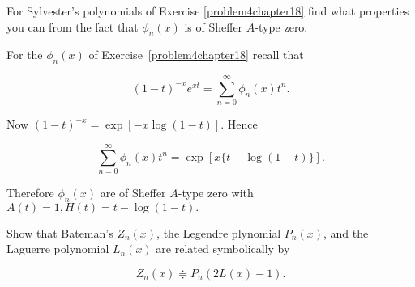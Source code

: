 \begin{problem}\label{problem5chapter18}
For Sylvester's polynomials of Exercise \ref{problem4chapter18} find what properties you can from the fact that $\phi_n(x)$ is of Sheffer $A$-type zero.
\end{problem}
\begin{solution}
For the $\phi_n(x)$ of Exercise~\ref{problem4chapter18} recall that

$$(1-t)^{-x} e^{xt} = \displaystyle\sum_{n=0}^{\infty} \phi_n(x) t^n.$$

Now $(1-t)^{-x} = \exp[-x \log(1-t)].$ Hence

$$\displaystyle\sum_{n=0}^{\infty} \phi_n(x) t^n = \exp[x \{t-\log(1-t)\}].$$

Therefore $\phi_n(x)$ are of Sheffer $A$-type zero with $A(t)=1, H(t)=t-\log(1-t).$
\end{solution}
\begin{problem}\label{problem6chapter18}
Show that Bateman's $Z_n(x)$, the Legendre plynomial $P_n(x)$, and the Laguerre polynomial $L_n(x)$ are related symbolically by

$$Z_n(x) \doteqdot P_n(2L(x)-1).$$
\end{problem}
